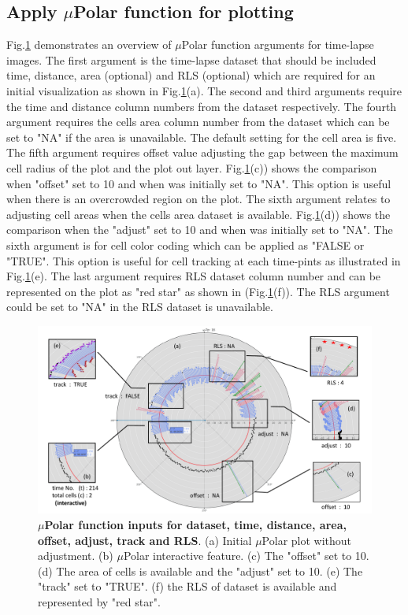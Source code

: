 \documentclass[conference]{IEEEtran}
\begin{document}
\subsection{Apply $\mu$Polar function for plotting}

Fig.\ref{fig:label} demonstrates an overview of $\mu$Polar function arguments for time-lapse images. The first argument is the time-lapse dataset that should be included time, distance, area (optional) and RLS (optional) which are required for an initial visualization as shown in Fig.\ref{fig:label}(a). The second and third arguments require the time and distance  column numbers from the dataset respectively. The fourth argument requires the cells area column number from the dataset which  can be set to "NA" if the area is unavailable. The default setting for the cell area is five. The fifth argument requires offset value adjusting the gap between the maximum cell radius of the plot and the plot out layer. Fig.\ref{fig:label}(c)) shows the comparison when "offset" set to 10 and when was initially set to "NA". This option is useful when there is an overcrowded region on the plot. The sixth argument relates to adjusting cell areas when the cells area dataset is available. Fig.\ref{fig:label}(d)) shows the comparison when the "adjust" set to 10 and  when was initially set to "NA". The sixth argument is for  cell color coding which can be applied as  "FALSE or "TRUE". This option is useful for cell tracking at each time-pints as illustrated in Fig.\ref{fig:label}(e).  The last argument requires RLS dataset column number and can be represented on the plot as "red star" as shown in (Fig.\ref{fig:label}(f)). The RLS argument could be set to "NA" in the RLS dataset is unavailable.


\begin{figure}
\centering
\includegraphics[width=\textwidth,height=10 cm]{Patterns/option.pdf}
\caption{ \textbf{ $\mu$Polar function inputs for dataset, time, distance, area, offset, adjust, track and RLS}. (a) Initial $\mu$Polar plot without adjustment. (b) $\mu$Polar interactive feature. (c) The "offset" set to 10. (d) The area of cells is available and the "adjust" set to 10. (e) The "track" set to "TRUE". (f) the RLS of dataset is available and represented by "red star".}
\label{fig:label}
\end{figure}
\end{document}
